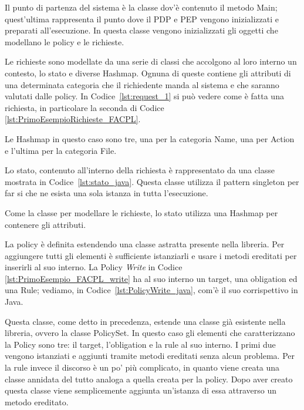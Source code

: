 Il punto di partenza del sistema è la classe dov'è contenuto il metodo Main; quest'ultima rappresenta il punto dove il \ac{PDP} e \ac{PEP} vengono inizializzati e preparati all'esecuzione. In questa classe vengono inizializzati gli oggetti che modellano le policy e  le richieste. \par
Le richieste sono modellate da una serie di classi che accolgono al loro interno un contesto, lo stato e diverse Hashmap. Ognuna di queste contiene gli attributi di una determinata categoria che il richiedente manda al sistema e che saranno valutati dalle policy. In Codice~\ref{lst:request_1} si può vedere come è fatta una richiesta, in particolare la seconda di Codice \ref{lst:PrimoEsempioRichieste_FACPL}.

Le Hashmap in questo caso sono tre, una per la categoria Name, una per Action e l'ultima per la categoria File. \par
Lo stato, contenuto all'interno della richiesta è rappresentato da una classe mostrata in Codice~\ref{lst:stato_java}. Questa classe utilizza il pattern singleton per far si che ne esista una sola istanza in tutta l'esecuzione. 

Come la classe per modellare le richieste, lo stato utilizza una Hashmap per contenere gli attributi.\par
La policy è definita estendendo una classe astratta presente nella libreria. Per aggiungere tutti gli elementi è sufficiente istanziarli e usare i metodi ereditati per inserirli al suo interno.
La Policy \textit{Write} in Codice \ref{lst:PrimoEsempio_FACPL_write} ha al suo interno un target, una obligation ed una Rule; vediamo, in Codice~\ref{lst:PolicyWrite_java}, com'è il suo corrispettivo in Java.

Questa classe, come detto in precedenza, estende una classe già esistente nella libreria, ovvero la classe PolicySet. In questo caso gli elementi che caratterizzano la Policy sono tre: il target, l'obligation e la rule al suo interno. I primi due vengono istanziati e aggiunti tramite metodi ereditati senza alcun problema. Per la rule invece il discorso è un po' più complicato, in quanto viene creata una classe annidata del tutto analoga a quella creata per la policy. Dopo aver creato questa classe viene semplicemente aggiunta un'istanza di essa attraverso un metodo ereditato.
